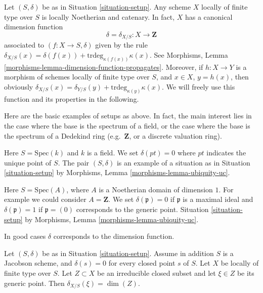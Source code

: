 \medskip\noindent
Let $(S, \delta)$ be as in Situation \ref{situation-setup}.
Any scheme $X$ locally of finite type over $S$ is locally Noetherian
and catenary. In fact, $X$ has a canonical dimension function
$$
\delta = \delta_{X/S} : X \longrightarrow \mathbf{Z}
$$
associated to $(f : X \to S, \delta)$ given by the rule
$\delta_{X/S}(x) = \delta(f(x)) + \text{trdeg}_{\kappa(f(x))}\kappa(x)$.
See Morphisms, Lemma \ref{morphisms-lemma-dimension-function-propagates}.
Moreover, if $h : X \to Y$ is a morphism of schemes locally of finite
type over $S$, and $x \in X$, $y = h(x)$,
then obviously
$\delta_{X/S}(x) = \delta_{Y/S}(y) + \text{trdeg}_{\kappa(y)}\kappa(x)$.
We will freely use this function and its properties in the following.

\medskip\noindent
Here are the basic examples of setups as above.
In fact, the main interest lies in the case where the base
is the spectrum of a field, or the case where the base
is the spectrum of a Dedekind ring (e.g.\ $\mathbf{Z}$,
or a discrete valuation ring).

\begin{example}
\label{example-field}
Here $S = \text{Spec}(k)$ and $k$ is a field.
We set $\delta(pt) = 0$ where $pt$ indicates the unique point of $S$.
The pair $(S, \delta)$ is an example of a situation as in
Situation \ref{situation-setup} by
Morphisms, Lemma \ref{morphisms-lemma-ubiquity-uc}.
\end{example}

\begin{example}
\label{example-domain-dimension-1}
Here $S = \text{Spec}(A)$, where $A$ is a Noetherian domain
of dimension $1$.
For example we could consider $A = \mathbf{Z}$.
We set $\delta(\mathfrak p) = 0$ if
$\mathfrak p$ is a maximal ideal and $\delta(\mathfrak p) = 1$
if $\mathfrak p = (0)$ corresponds to the generic point.
Situation \ref{situation-setup} by
Morphisms, Lemma \ref{morphisms-lemma-ubiquity-uc}.
\end{example}

\noindent
In good cases $\delta$ corresponds to the dimension function.

\begin{lemma}
\label{lemma-delta-is-dimension}
Let $(S, \delta)$ be as in Situation \ref{situation-setup}.
Assume in addition $S$ is a Jacobson scheme, and $\delta(s) = 0$ for every
closed point $s$ of $S$. Let $X$ be locally of finite type over $S$.
Let $Z \subset X$ be an irreducible closed subset and let
$\xi \in Z$ be its generic point.
Then $\delta_{X/S}(\xi) = \dim(Z)$.
\end{lemma}

